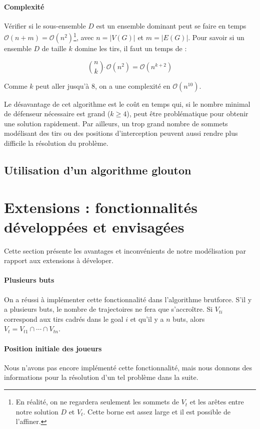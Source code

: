 \documentclass[12pt]{article}
\begin{document}
\paragraph{Complexité} Vérifier si le sous-ensemble $D$ est un ensemble dominant peut se faire en temps $\mathcal{O}(n+m) = \mathcal{O}(n^2)$\footnote{En réalité, on ne regardera seulement les sommets de $V_t$ et les arêtes entre notre solution $D$ et $V_t$. Cette borne est assez large et il est possible de l'affiner.}, avec $n = |V(G)|$ et $m = |E(G)|$. Pour savoir si un ensemble $D$ de taille $k$ domine les tirs, il faut un temps de :

\begin{equation*}
  \binom{n}{k} \dot\  \mathcal{O}(n^{2}) = \mathcal{O}(n^{k+2})
\end{equation*}

Comme $k$ peut aller jusqu'à 8, on a une complexité en $\mathcal{O}(n^{10})$.

Le désavantage de cet algorithme est le coût en temps qui, si le nombre minimal de défenseur nécessaire est grand ($k \geqslant 4$), peut être problématique pour obtenir une solution rapidement. Par ailleurs, un trop grand nombre de sommets modélisant des tirs ou des positions d'interception peuvent aussi rendre plus difficile la résolution du problème.

\subsection{Utilisation d'un algorithme glouton}

\section{Extensions : fonctionnalités développées et envisagées}

Cette section présente les avantages et inconvénients de notre modélisation par rapport aux extensions à déveloper.

\paragraph{Plusieurs buts}
On a réussi à implémenter cette fonctionnalité dans l'algorithme brutforce. S'il y a plusieurs buts, le nombre de trajectoires ne fera que s'accroître. Si $V_{ti}$ correspond aux tirs cadrés dans le goal $i$ et qu'il y a $n$ buts, alors $V_t = V_{t1} \cap \cdots \cap V_{tn}$.


\paragraph{Position initiale des joueurs} Nous n'avons pas encore implémenté cette fonctionnalité, mais nous donnons des informations pour la résolution d'un tel problème dans la suite.
\end{document}
